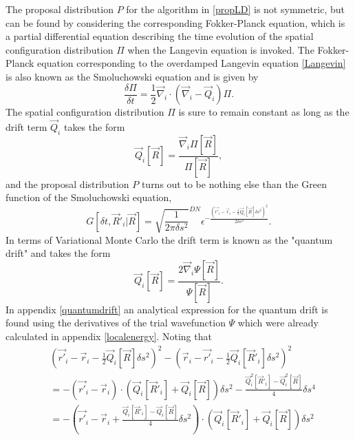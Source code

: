 \documentclass[a4paper,8pt]{article}
\begin{document}
\begin{multicols}{2}
The proposal distribution $P$ for the algorithm in \eqref{propLD} is not symmetric, but can be found by considering the corresponding Fokker-Planck equation, which is a partial differential equation describing the time evolution of the spatial configuration distribution $\Pi$ when the Langevin equation is invoked. The Fokker-Planck equation corresponding to the overdamped Langevin equation \eqref{Langevin} is also known as the Smoluchowski equation and is given by
\begin{equation}
\frac{\delta\Pi}{\delta t} = \frac{1}{2}\vec{\nabla}_i\cdot\left(\vec{\nabla}_i-\vec{Q}_i\right)\Pi. \label{Smoluchowski}
\end{equation}
The spatial configuration distribution $\Pi$ is sure to remain constant as long as the drift term $\vec{Q}_i$ takes the form
\begin{equation}
\vec{Q}_i[\vec{R}] = \frac{\vec{\nabla}_i\Pi[\vec{R}]}{\Pi[\vec{R}]},
\end{equation}
and the proposal distribution $P$ turns out to be nothing else than the Green function of the Smoluchowski equation,
\begin{equation}
G[\delta t, \vec{R}'_i|\vec{R}] = \sqrt{\frac{1}{2\pi \delta s^2}}^{DN} \epsilon^{-\frac{\left(\vec{r'}_i-\vec{r}_i-\frac{1}{2}\vec{Q}_i[\vec{R}]\delta s^2\right)^2}{2\delta s^2}}. \label{Green}
\end{equation}
In terms of Variational Monte Carlo the drift term is known as the "quantum drift" and takes the form
\begin{equation}
\vec{Q}_i[\vec{R}] = \frac{2\vec{\nabla}_i\Psi[\vec{R}]}{\Psi[\vec{R}]}. \label{defQuantumdrift}
\end{equation}
In appendix \ref{quantumdrift} an analytical expression for the quantum drift is found using the derivatives of the trial wavefunction $\Psi$ which were already calculated in appendix \ref{localenergy}. Noting that
\begin{align}
&\left(\vec{r'}_i-\vec{r}_i-\frac{1}{2}\vec{Q}_i[\vec{R}]\delta s^2 \right)^2-\left(\vec{r}_i-\vec{r'}_i-\frac{1}{2}\vec{Q}_i[\vec{R}'_i]\delta s^2\right)^2 \nonumber\\
&= -\left(\vec{r'}_i-\vec{r}_i\right) \cdot \left(\vec{Q}_i[\vec{R}'_i]+\vec{Q}_i[\vec{R}]\right)\delta s^2-\frac{\vec{Q}_i^2[\vec{R}'_i]-\vec{Q}_i^2[\vec{R}]}{4}\delta s^4 \nonumber\\
&= -\left(\vec{r'}_i-\vec{r}_i+\frac{\vec{Q}_i[\vec{R}'_i]-\vec{Q}_i[\vec{R}]}{4}\delta s^2\right)\cdot\left(\vec{Q}_i[\vec{R}'_i]+\vec{Q}_i[\vec{R}]\right)\delta s^2 \nonumber

\end{align}
\end{multicols}
\end{document}
